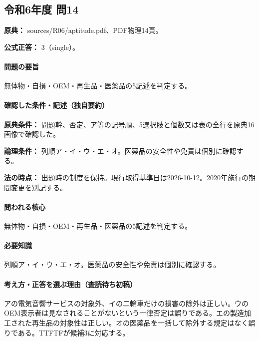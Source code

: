 \subsection{令和6年度 問14}
\label{q:r06-reg-apt-14}

\noindent\textbf{原典：} sources/R06/aptitude.pdf、PDF物理14頁。

\textbf{公式正答：} 3（single）。

\paragraph{問題の要旨} 無体物・自損・OEM・再生品・医薬品の5記述を判定する。

\paragraph{確認した条件・記述（独自要約）}\mbox{}\par

\noindent\textbf{原典条件：} 問題幹、否定、ア等の記号順、5選択肢と個数又は表の全行を原典16画像で確認した。\par

\noindent\textbf{論理条件：} 列順ア・イ・ウ・エ・オ。医薬品の安全性や免責は個別に確認する。\par

\noindent\textbf{法の時点：} 出題時の制度を保持。現行取得基準日は2026-10-12。2020年施行の期間変更を別記する。\par

\paragraph{問われる核心} 無体物・自損・OEM・再生品・医薬品の5記述を判定する。

\paragraph{必要知識} 列順ア・イ・ウ・エ・オ。医薬品の安全性や免責は個別に確認する。

\paragraph{考え方・正答を選ぶ理由（査読待ち初稿）} アの電気音響サービスの対象外、イの二輪車だけの損害の除外は正しい。ウのOEM表示者は見なされることがないという一律否定は誤りである。エの製造加工された再生品の対象性は正しい。オの医薬品を一括して除外する規定はなく誤りである。TTFTFが候補3に対応する。

